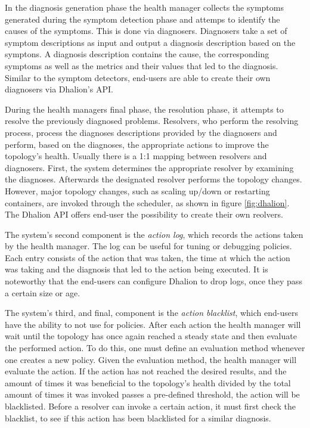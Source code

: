         \quad In the diagnosis generation phase the health manager collects the symptoms generated during the symptom detection phase and attemps to identify the causes 
        of the symptoms. 
        This is done via diagnosers. Diagnosers take a set of symptom descriptions as input and output a diagnosis description based on the symptons. 
        A diagnosis description contains the cause, the corresponding symptoms as well as the metrics and their values that led to the diagnosis.
        Similar to the symptom detectors, end-users are able to create their own diagnosers via Dhalion's API.

        \quad During the health managers final phase, the resolution phase, it attempts to resolve the previously diagnosed problems.
        Resolvers, who perform the resolving process, process the diagnoses descriptions provided by the diagnosers and perform, based on the diagnoses, the 
        appropriate actions to improve the topology's health. Usually there is a 1:1 mapping between resolvers and diagnosers.
        First, the system determines the appropriate resolver by examining the diagnoses. Afterwards the designated resolver performs the topology changes.
        However, major topology changes, such as scaling up/down or restarting containers, are invoked through the scheduler, as shown in figure \ref{fig:dhalion}.
        The Dhalion API offers end-user the possibility to create their own reolvers.

        \quad The system's second component is the \textit{action log}, which records the actions taken by the health manager.
        The log can be useful for tuning or debugging policies. Each entry consists of the action that was taken, the time at which the action was taking and the diagnosis 
        that led to the action being executed. 
        It is noteworthy that the end-users can configure Dhalion to drop logs, once they pass a certain size or age.

        \quad The system's third, and final, component is the \textit{action blacklist}, which end-users have the ability to not use for policies.
        After each action the health manager will wait until the topology has once again reached a steady state and then evaluate the performed action.
        To do this, one must define an evaluation method whenever one creates a new policy. Given the evaluation method, the health manager will evaluate the action.
        If the action has not reached the desired results, and the amount of times it was beneficial to the topology's health divided by the total amount of times it 
        was invoked passes a pre-defined threshold, the action will be blacklisted.
        Before a resolver can invoke a certain action, it must first check the blacklist, to see if this action has been blacklisted for a similar diagnosis.


